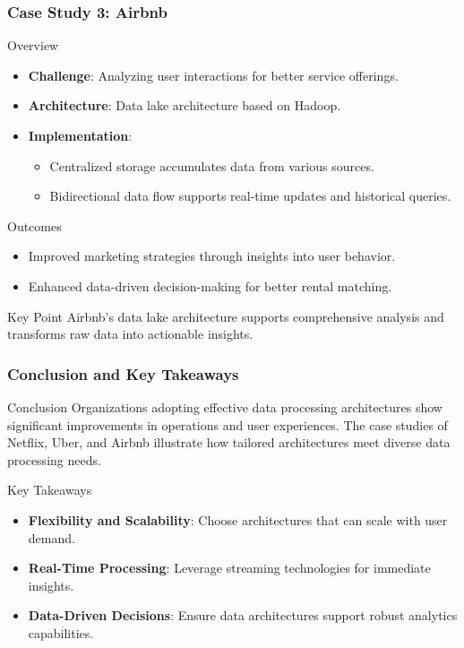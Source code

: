 \documentclass[aspectratio=169]{beamer}
\begin{document}
\begin{frame}[fragile]
    \frametitle{Case Study 3: Airbnb}
    \begin{block}{Overview}
        \begin{itemize}
            \item \textbf{Challenge}: Analyzing user interactions for better service offerings.
            \item \textbf{Architecture}: Data lake architecture based on Hadoop.
            \item \textbf{Implementation}:
            \begin{itemize}
                \item Centralized storage accumulates data from various sources.
                \item Bidirectional data flow supports real-time updates and historical queries.
            \end{itemize}
        \end{itemize}
    \end{block}
    \begin{block}{Outcomes}
        \begin{itemize}
            \item Improved marketing strategies through insights into user behavior.
            \item Enhanced data-driven decision-making for better rental matching.
        \end{itemize}
    \end{block}
    \begin{block}{Key Point}
        Airbnb's data lake architecture supports comprehensive analysis and transforms raw data into actionable insights.
    \end{block}
\end{frame}

\begin{frame}[fragile]
    \frametitle{Conclusion and Key Takeaways}
    \begin{block}{Conclusion}
        Organizations adopting effective data processing architectures show significant improvements in operations and user experiences. The case studies of Netflix, Uber, and Airbnb illustrate how tailored architectures meet diverse data processing needs.
    \end{block}
    \begin{block}{Key Takeaways}
        \begin{itemize}
            \item \textbf{Flexibility and Scalability}: Choose architectures that can scale with user demand.
            \item \textbf{Real-Time Processing}: Leverage streaming technologies for immediate insights.
            \item \textbf{Data-Driven Decisions}: Ensure data architectures support robust analytics capabilities.
        \end{itemize}
    \end{block}
\end{frame}
\end{document}
